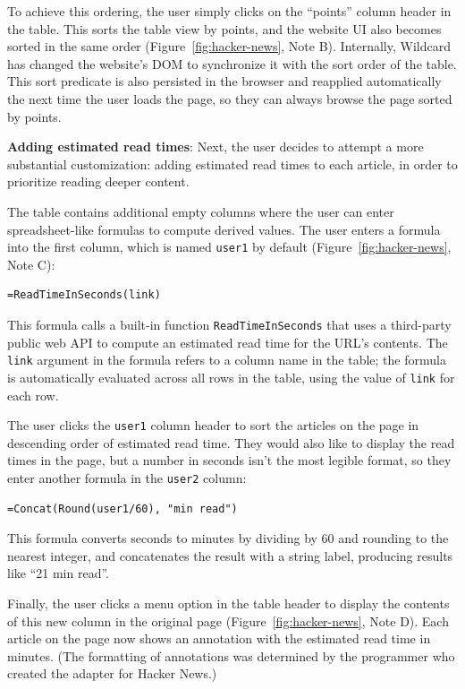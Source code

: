 \documentclass[sigplan,screen,10pt,anonymous,review]{acmart}
\begin{document}
To achieve this ordering, the user simply clicks on the ``points''
column header in the table. This sorts the table view by points, and the
website UI also becomes sorted in the same order
(Figure~\ref{fig:hacker-news}, Note B). Internally, Wildcard has changed
the website's DOM to synchronize it with the sort order of the table.
This sort predicate is also persisted in the browser and reapplied
automatically the next time the user loads the page, so they can always
browse the page sorted by points.

\textbf{Adding estimated read times}: Next, the user decides to attempt
a more substantial customization: adding estimated read times to each
article, in order to prioritize reading deeper content.

The table contains additional empty columns where the user can enter
spreadsheet-like formulas to compute derived values. The user enters a
formula into the first column, which is named \texttt{user1} by default
(Figure~\ref{fig:hacker-news}, Note C):

\begin{verbatim}
=ReadTimeInSeconds(link)
\end{verbatim}

This formula calls a built-in function \texttt{ReadTimeInSeconds} that
uses a third-party public web API to compute an estimated read time for
the URL's contents. The \texttt{link} argument in the formula refers to
a column name in the table; the formula is automatically evaluated
across all rows in the table, using the value of \texttt{link} for each
row.

The user clicks the \texttt{user1} column header to sort the articles on
the page in descending order of estimated read time. They would also
like to display the read times in the page, but a number in seconds
isn't the most legible format, so they enter another formula in the
\texttt{user2} column:

\begin{verbatim}
=Concat(Round(user1/60), "min read")
\end{verbatim}

This formula converts seconds to minutes by dividing by 60 and rounding
to the nearest integer, and concatenates the result with a string label,
producing results like ``21 min read''.

Finally, the user clicks a menu option in the table header to display
the contents of this new column in the original page
(Figure~\ref{fig:hacker-news}, Note D). Each article on the page now
shows an annotation with the estimated read time in minutes. (The
formatting of annotations was determined by the programmer who created
the adapter for Hacker News.)
\end{document}
